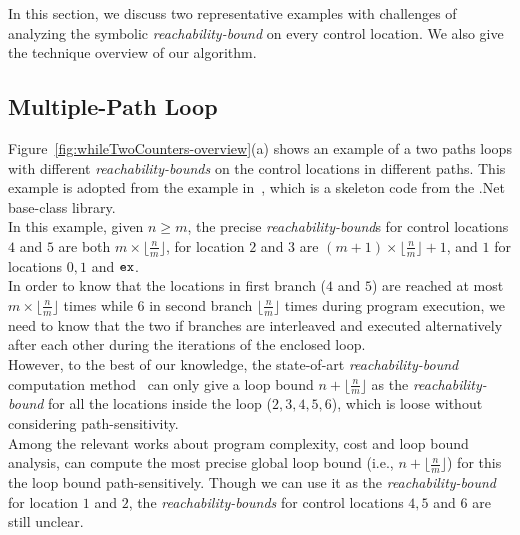 In this section, we discuss two representative examples with
challenges of analyzing the symbolic
\emph{reachability-bound} on
every control location.
We also give the technique overview of our algorithm.
%
\subsection{Multiple-Path Loop}
\label{sec:overview-multiplepath}

Figure~\ref{fig:whileTwoCounters-overview}(a) shows an example of a two paths loops
with different \emph{reachability-bounds} on the control locations in different paths.
This example is adopted from the example in~\cite{Sumit2010rechability}, which
is a skeleton code from the .Net base-class library.
\\
In this example, given $n \geq m$,
the precise \emph{reachability-bound}s for control locations $4$ and $5$ are both $m \times \lfloor\frac{n}{m}\rfloor$,
for location $2$ and $3$ are $(m + 1) \times \lfloor\frac{n}{m}\rfloor + 1$, 
and $1$ for locations $0, 1$ and $\mathtt{ex}$.
\\
In order to know that the locations in first branch ($4$ and $5$) are reached at most $m \times \lfloor\frac{n}{m}\rfloor$ times
while $6$ in second branch $\lfloor\frac{n}{m}\rfloor$ times
 during program execution,
we need to know that the two if branches are interleaved and executed alternatively after each other
during the iterations of the enclosed loop.
\\
However, to the best of our knowledge, the state-of-art \emph{reachability-bound} computation method~\cite{Sumit2010rechability}
can only give a loop bound $n + \lfloor\frac{n}{m}\rfloor$
as the \emph{reachability-bound} for all the locations inside the loop ($2, 3, 4, 5, 6$), which is loose without considering path-sensitivity.
\\
Among the relevant works about program complexity, cost and loop bound analysis, \cite{GulwaniJK09} can compute the most precise global
loop bound (i.e., $n + \lfloor\frac{n}{m}\rfloor$) for this the loop bound path-sensitively.
Though we can use it as the \emph{reachability-bound} for location $1$ and $2$,
the \emph{reachability-bounds} for control locations $4, 5$ and $6$ are still unclear.
